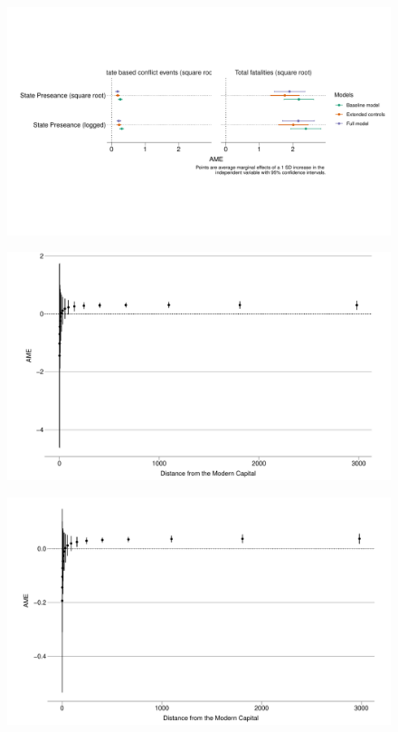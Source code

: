 \documentclass[12pt]{article}
\begin{document}
\begin{figure}[htpb]
	\centering
	\includegraphics[width=\linewidth]{"../R/Output/conflictMargins.pdf"}
	\caption{}
	\label{margins}
\end{figure}

\begin{figure}[htpb]
	\centering
	\includegraphics[width=\linewidth]{"../R/Output/deaths_int_plot.pdf"}
	\caption{}
	\label{deaths_int}
\end{figure}

\begin{figure}[htpb]
	\centering
	\includegraphics[width=\linewidth]{"../R/Output/state_based_int_plot.pdf"}
	\caption{}
	\label{sb_int}
\end{figure}
\end{document}
